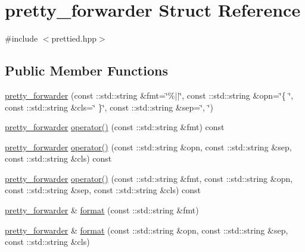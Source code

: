 \hypertarget{structyuh_1_1range__detail_1_1pretty__forwarder}{\section{pretty\-\_\-forwarder \-Struct \-Reference}
\label{db/d79/structyuh_1_1range__detail_1_1pretty__forwarder}
}


{\ttfamily \#include $<$prettied.\-hpp$>$}

\subsection*{\-Public \-Member \-Functions}
\begin{DoxyCompactItemize}
\item 
\hyperlink{structyuh_1_1range__detail_1_1pretty__forwarder_abb37f11892f82017aa7af96b9c8578b8}{pretty\-\_\-forwarder} (const \-::std\-::string \&fmt=\char`\"{}\%$|$$|$\char`\"{}, const \-::std\-::string \&opn=\char`\"{}\{ \char`\"{}, const \-::std\-::string \&cls=\char`\"{} \}\char`\"{}, const \-::std\-::string \&sep=\char`\"{}, \char`\"{})
\item 
\hyperlink{structyuh_1_1range__detail_1_1pretty__forwarder}{pretty\-\_\-forwarder} \hyperlink{structyuh_1_1range__detail_1_1pretty__forwarder_abc2c3b71f5b31a64a90349b7b726087a}{operator()} (const \-::std\-::string \&fmt) const 
\item 
\hyperlink{structyuh_1_1range__detail_1_1pretty__forwarder}{pretty\-\_\-forwarder} \hyperlink{structyuh_1_1range__detail_1_1pretty__forwarder_a0154708f9cac32192be85b2814883955}{operator()} (const \-::std\-::string \&opn, const \-::std\-::string \&sep, const \-::std\-::string \&cls) const 
\item 
\hyperlink{structyuh_1_1range__detail_1_1pretty__forwarder}{pretty\-\_\-forwarder} \hyperlink{structyuh_1_1range__detail_1_1pretty__forwarder_a7b2d7f358435847dbc54212cb435c712}{operator()} (const \-::std\-::string \&fmt, const \-::std\-::string \&opn, const \-::std\-::string \&sep, const \-::std\-::string \&cls) const 
\item 
\hyperlink{structyuh_1_1range__detail_1_1pretty__forwarder}{pretty\-\_\-forwarder} \& \hyperlink{structyuh_1_1range__detail_1_1pretty__forwarder_a451f27e3f946f1f65cf03056a8022985}{format} (const \-::std\-::string \&fmt)
\item 
\hyperlink{structyuh_1_1range__detail_1_1pretty__forwarder}{pretty\-\_\-forwarder} \& \hyperlink{structyuh_1_1range__detail_1_1pretty__forwarder_a864309fa234f8bc542650c5b956db43f}{format} (const \-::std\-::string \&opn, const \-::std\-::string \&sep, const \-::std\-::string \&cls)
$$
\end{DoxyCompactItemize}
